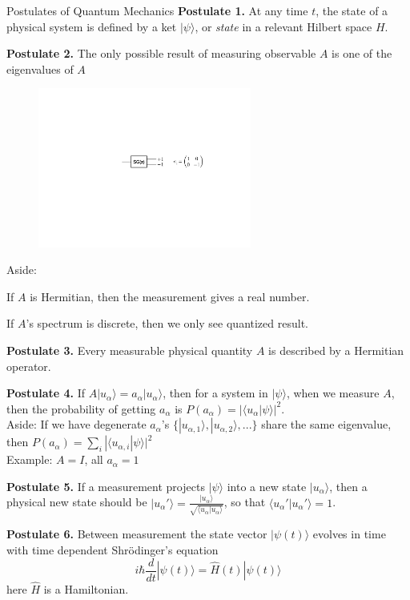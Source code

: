 \documentclass[UTF8,12pt]{article} %
\numberwithin{equation}{section}
\begin{document}
\begin{myboxes}{Postulates of Quantum Mechanics}{}
\textbf{Postulate 1.} At any time $t$, the state of a physical system is defined by a ket $|\psi\rangle$, or \textit{state} in a relevant Hilbert space $H$.\\\par
\textbf{Postulate 2.} The only possible result of measuring observable $A$ is one of the eigenvalues of $A$
\begin{figure}[H]
\begin{center}
\includegraphics[width=7cm]{post2}
\end{center}
\end{figure}
Aside:
\begin{enumerate*}
\item If $A$ is Hermitian, then the measurement gives a real number.
\item If $A$'s spectrum is discrete, then we only see quantized result.
\end{enumerate*}
\textbf{Postulate 3.} Every measurable physical quantity $A$ is described by a Hermitian operator.\\\par
\textbf{Postulate 4.} If $A|u_{\alpha}\rangle = a_{\alpha}|u_{\alpha}\rangle$, then for a system in $|\psi\rangle$, when we measure $A$, then the probability of getting $a_{\alpha}$ is $P(a_{\alpha}) = |\langle u_{\alpha}|\psi\rangle|^{2}$.\\
Aside: If we have degenerate $a_{\alpha}$'s $\{|u_{\alpha,1}\rangle, |u_{\alpha,2}\rangle, ...\}$ share the same eigenvalue, then $P(a_{\alpha}) = \sum_{i} |\langle u_{\alpha,i}|\psi\rangle|^{2}$\\
Example: $A = I$, all $a_{\alpha} = 1$\\\par
\textbf{Postulate 5.} If a measurement projects $|\psi\rangle$ into a new state $|u_{\alpha}\rangle$, then a physical new state should be $|u_{\alpha}'\rangle = \frac{|u_{\alpha}\rangle}{\sqrt{\langle u_{\alpha}|u_{\alpha}\rangle}}$, so that $\langle u_{\alpha}'|u_{\alpha}'\rangle = 1$.\\\par
\textbf{Postulate 6.} Between measurement the state vector $|\psi(t)\rangle$ evolves in time with time dependent Shr\"{o}dinger's equation $$i\hbar \frac{d}{dt}|\psi(t)\rangle = \hat{H}(t)|\psi(t)\rangle$$ here $\hat{H}$ is a Hamiltonian.
\end{myboxes}
\end{document}
